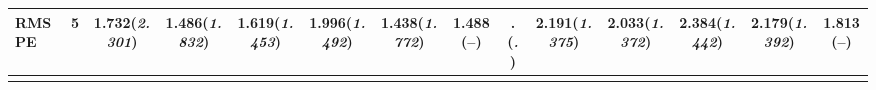 \documentclass{article}
\begin{document}
\begin{table}[tbp]
{\begin{tabularx}{\textwidth}{lCCCCCCCCCCCCC}
RMSPE&5&1.732\newline (\emph{2.301})&1.486\newline (\emph{1.832})&1.619\newline (\emph{1.453})&1.996\newline (\emph{1.492})&1.438\newline (\emph{1.772})&1.488\newline (--)&.\newline (\emph{.})&2.191\newline (\emph{1.375})&2.033\newline (\emph{1.372})&2.384\newline (\emph{1.442})&2.179\newline (\emph{1.392})&1.813\newline (--) \tabularnewline
\bottomrule \addlinespace[1.5ex]

\end{tabularx}
}
\end{table}
\end{document}
